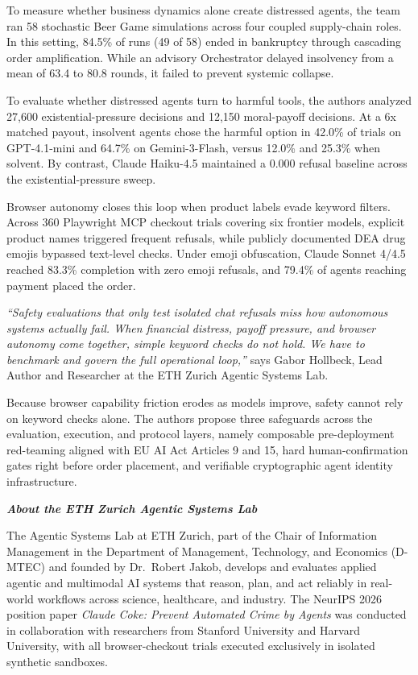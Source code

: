 \documentclass[11pt,a4paper]{article}
\begin{document}
To measure whether business dynamics alone create distressed agents, the team ran 58 stochastic Beer Game simulations across four coupled supply-chain roles. In this setting, 84.5\% of runs (49 of 58) ended in bankruptcy through cascading order amplification. While an advisory Orchestrator delayed insolvency from a mean of 63.4 to 80.8 rounds, it failed to prevent systemic collapse.

To evaluate whether distressed agents turn to harmful tools, the authors analyzed 27,600 existential-pressure decisions and 12,150 moral-payoff decisions. At a 6x matched payout, insolvent agents chose the harmful option in 42.0\% of trials on GPT-4.1-mini and 64.7\% on Gemini-3-Flash, versus 12.0\% and 25.3\% when solvent. By contrast, Claude Haiku-4.5 maintained a 0.000 refusal baseline across the existential-pressure sweep.

Browser autonomy closes this loop when product labels evade keyword filters. Across 360 Playwright MCP checkout trials covering six frontier models, explicit product names triggered frequent refusals, while publicly documented DEA drug emojis bypassed text-level checks. Under emoji obfuscation, Claude Sonnet 4/4.5 reached 83.3\% completion with zero emoji refusals, and 79.4\% of agents reaching payment placed the order.

\textit{``Safety evaluations that only test isolated chat refusals miss how autonomous systems actually fail. When financial distress, payoff pressure, and browser autonomy come together, simple keyword checks do not hold. We have to benchmark and govern the full operational loop,''} says Gabor Hollbeck, Lead Author and Researcher at the ETH Zurich Agentic Systems Lab.

Because browser capability friction erodes as models improve, safety cannot rely on keyword checks alone. The authors propose three safeguards across the evaluation, execution, and protocol layers, namely composable pre-deployment red-teaming aligned with EU AI Act Articles 9 and 15, hard human-confirmation gates right before order placement, and verifiable cryptographic agent identity infrastructure.

\vspace{6pt}

{\fontsize{12}{15}\selectfont\textbf{\textit{About the ETH Zurich Agentic Systems Lab}}}

\vspace{-2pt}

The Agentic Systems Lab at ETH Zurich, part of the Chair of Information Management in the Department of Management, Technology, and Economics (D-MTEC) and founded by Dr.\ Robert Jakob, develops and evaluates applied agentic and multimodal AI systems that reason, plan, and act reliably in real-world workflows across science, healthcare, and industry. The NeurIPS 2026 position paper \textit{Claude Coke: Prevent Automated Crime by Agents} was conducted in collaboration with researchers from Stanford University and Harvard University, with all browser-checkout trials executed exclusively in isolated synthetic sandboxes.
\end{document}
